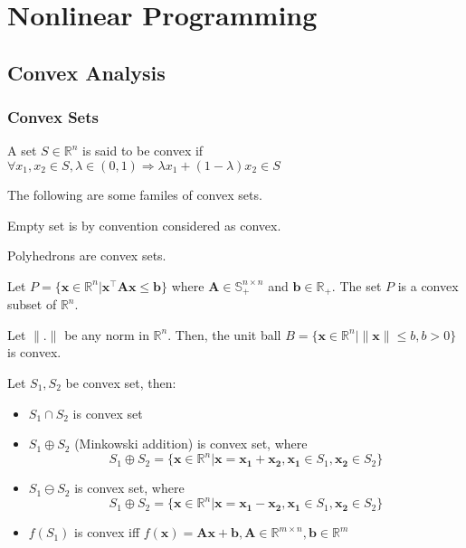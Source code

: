 \part{Nonlinear Programming}
	\chapter{Convex Analysis}
		\section{Convex Sets}
			\begin{definition}
				A set $S\in \mathbb{R}^n$ is said to be convex if $\forall x_1, x_2 \in S, \lambda \in (0, 1) \Rightarrow \lambda x_1 + (1-\lambda)x_2 \in S$
			\end{definition}

			The following are some familes of convex sets.

			\begin{example}
				Empty set is by convention considered as convex.
			\end{example}

			\begin{example}
				Polyhedrons are convex sets.
			\end{example}

			\begin{example}
				Let $P = \{\mathbf{x}\in \mathbb{R}^n | \mathbf{x}^\top \mathbf{Ax} \le \mathbf{b}\}$ where $\mathbf{A} \in \mathbb{S}_+^{n\times n}$ and $\mathbf{b} \in \mathbb{R}_+$. The set $P$ is a convex subset of $\mathbb{R}^n$.
			\end{example}

			\begin{example}
				Let $\|.\|$ be any norm in $\mathbb{R}^n$. Then, the unit ball $B = \{\mathbf{x} \in \mathbb{R}^n | \|\mathbf{x}\| \le b, b > 0\}$ is convex.
			\end{example}

			Let	$S_1, S_2$ be convex set, then:
			\begin{itemize}
				\item $S_1 \cap S_2$ is convex set
				\item $S_1 \oplus S_2$ (Minkowski addition) is convex set, where
					\begin{equation}
						S_1 \oplus S_2 = \{\mathbf{x} \in \mathbb{R}^n| \mathbf{x} = \mathbf{x_1} + \mathbf{x_2}, \mathbf{x_1} \in S_1, \mathbf{x_2} \in S_2\}
					\end{equation}
				\item $S_1 \ominus S_2$ is convex set, where
					\begin{equation}
						S_1 \oplus S_2 = \{\mathbf{x} \in \mathbb{R}^n| \mathbf{x} = \mathbf{x_1} - \mathbf{x_2}, \mathbf{x_1} \in S_1, \mathbf{x_2} \in S_2\}
					\end{equation}
				\item $f(S_1)$ is convex iff $f(\mathbf{x}) = \mathbf{Ax} + \mathbf{b}, \mathbf{A} \in \mathbb{R}^{m\times n}, \mathbf{b} \in \mathbb{R}^m$
			\end{itemize}

